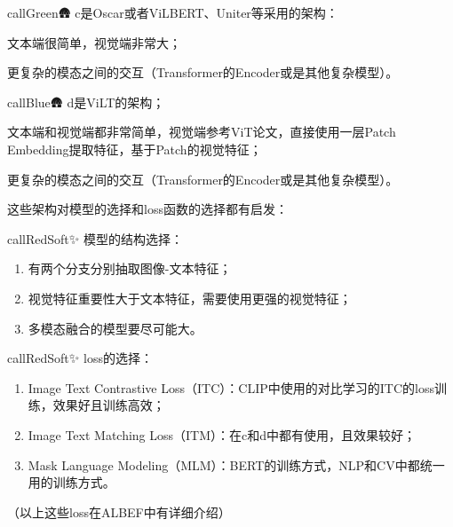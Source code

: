 \documentclass[zihao=false,fontset=windows]{ctexart}
\begin{document}
\begin{tcbraster}[raster columns=2, raster equal height=rows, raster column skip=9pt, raster row skip=8pt, raster left skip=0pt, raster right skip=0pt]
\begin{feishuboxnb}{callGreen}{🛖}
c是Oscar或者ViLBERT、Uniter等采用的架构：\par
文本端很简单，视觉端非常大；\par
更复杂的模态之间的交互（Transformer的Encoder或是其他复杂模型）。\par
\end{feishuboxnb}
\begin{feishuboxnb}{callBlue}{🛖}
d是ViLT的架构；\par
文本端和视觉端都非常简单，视觉端参考ViT论文，直接使用一层Patch Embedding提取特征，基于Patch的视觉特征；\par
更复杂的模态之间的交互（Transformer的Encoder或是其他复杂模型）。\par
\end{feishuboxnb}
\end{tcbraster}
这些架构对模型的选择和loss函数的选择都有启发：\par
\begin{tcbraster}[raster columns=2, raster equal height=rows, raster column skip=9pt, raster row skip=8pt, raster left skip=0pt, raster right skip=0pt]
\begin{feishuboxnb}{callRedSoft}{✨}
模型的结构选择：\par
\begin{enumerate}
\item 有两个分支分别抽取图像-文本特征；
\item 视觉特征重要性大于文本特征，需要使用更强的视觉特征；
\item 多模态融合的模型要尽可能大。
\end{enumerate}
\end{feishuboxnb}
\begin{feishuboxnb}{callRedSoft}{✨}
loss的选择：\par
\begin{enumerate}
\item Image Text Contrastive Loss（ITC）：CLIP中使用的对比学习的ITC的loss训练，效果好且训练高效；
\item Image Text Matching Loss（ITM）：在c和d中都有使用，且效果较好；
\item Mask Language Modeling（MLM）：BERT的训练方式，NLP和CV中都统一用的训练方式。
\end{enumerate}
（以上这些loss在ALBEF中有详细介绍）\par
\end{feishuboxnb}
\end{tcbraster}
\end{document}
